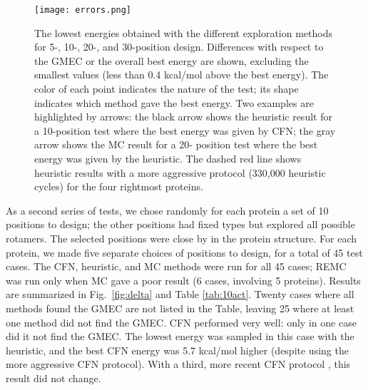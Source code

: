 \begin{figure}[!htbp]
  \begin{center}
    \texttt{[image: errors.png]}
  \end{center}
  \caption{The lowest energies obtained with the different exploration
methods for 5-, 10-, 20-, and 30-position design. Differences with respect
to the GMEC or the overall best energy are shown, excluding the smallest
values (less than 0.4 kcal/mol above the best energy). The color of each
point indicates the nature of the test; its shape indicates which method
gave the best energy. Two examples are highlighted by arrows: the black
arrow shows the heuristic result for a 10-position test where the best
energy was given by CFN; the gray arrow shows the MC result for a 20-
position test where the best energy was given by the heuristic. The dashed
red line shows heuristic results with a more aggressive protocol (330,000
heuristic cycles) for the four rightmost proteins.
}
      \label{fig:errors}
\end{figure}

As a second series of tests, we chose randomly for each protein a set of 10 positions to design; the other positions had fixed types but explored all possible rotamers. The selected positions were close by in the protein structure. For each protein, we made five separate choices of positions to design, for a total of 45 test cases. The CFN, heuristic, and MC methods were run for all 45 cases; REMC was run only when MC gave a poor result (6 cases, involving 5 proteins).
Results are summarized in Fig.\ \ref{fig:delta} and Table \ref{tab:10act}. Twenty cases where all methods found the GMEC are not listed in the Table, leaving 25 where at least one method did not find the GMEC. CFN performed very well: only in one case did it not find the GMEC. The lowest energy was sampled in this case with the heuristic, and the best CFN energy was 5.7 kcal/mol higher (despite using the more aggressive CFN protocol). With a third, more recent CFN protocol \cite{Simoncini15}, this result did not change. 

